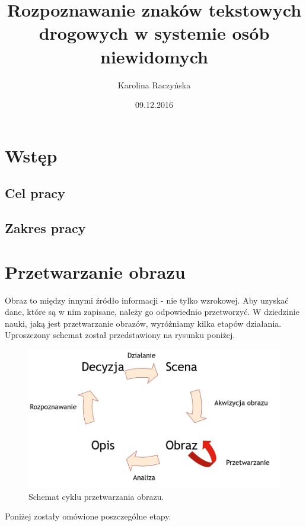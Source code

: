 \documentclass[eng,oneside]{mgr}
\title{Rozpoznawanie znaków tekstowych drogowych w systemie osób niewidomych}
\author{Karolina Raczyńska}
\date{09.12.2016}
\begin{document}
\maketitle
\tableofcontents 
\chapter{Wstęp}
\section{Cel pracy}
\section{Zakres pracy}
\chapter{Przetwarzanie obrazu}
\hspace{1cm} Obraz to między innymi źródło informacji - nie tylko wzrokowej. Aby uzyskać dane, które są w nim zapisane, należy go odpowiednio przetworzyć. W dziedzinie nauki, jaką jest przetwarzanie obrazów, wyróżniamy kilka etapów działania. Uproszczony schemat został przedstawiony na rysunku poniżej.
\begin{figure}[htbp]
\centering
\includegraphics[scale=0.5]{cyklprzetwarzania.png}
\caption{Schemat cyklu przetwarzania obrazu.}\par\medskip
\end{figure}
\hspace{1cm} Poniżej zostały omówione poszczególne etapy.
\end{document}
